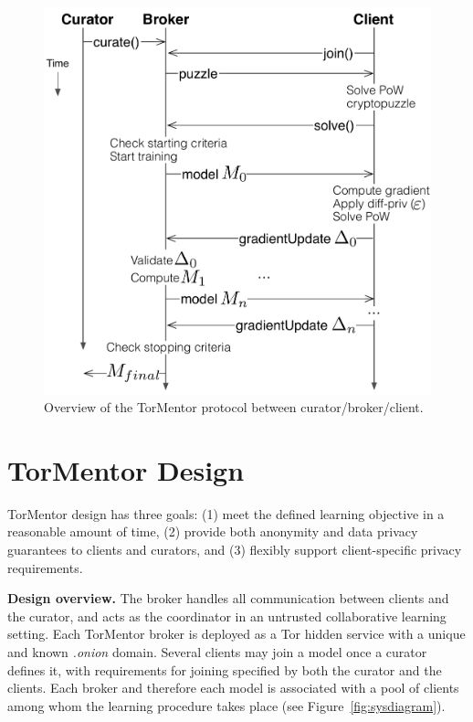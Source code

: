 \begin{figure}[h]
  \centering
  \includegraphics[width=.9\linewidth]{fig/tormentor-protocol.pdf}
  \caption{Overview of the TorMentor protocol between
    curator/broker/client.
    }
  \label{fig:protocol}
\end{figure}


\chapter{TorMentor Design}
\label{sec:design}

TorMentor design has three goals: (1) meet the defined learning
objective in a reasonable amount of time, (2) provide both anonymity
and data privacy guarantees to clients and curators, and (3) flexibly
support client-specific privacy requirements.

\textbf{Design overview.} The broker handles all communication between
clients and the curator, and acts as the coordinator in an untrusted
collaborative learning setting. Each TorMentor broker is deployed as a
Tor hidden service with a unique and known \textit{.onion}
domain. Several clients may join a model once a curator defines it,
with requirements for joining specified by both the curator and the
clients. Each broker and therefore each model is associated with a pool
of clients among whom the learning procedure takes place (see 
Figure~\ref{fig:sysdiagram}).

